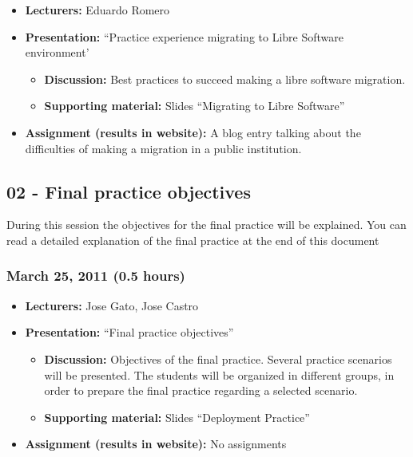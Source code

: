 \documentclass[a4paper]{article}
\begin{document}
\begin{itemize}
\item \textbf{Lecturers:} Eduardo Romero
\item \textbf{Presentation:} ``Practice experience migrating to Libre Software environment'
  \begin{itemize}
  \item \textbf{Discussion:} Best practices to succeed making a libre software migration. 
  \item \textbf{Supporting material:} Slides ``Migrating to Libre Software''
  \end{itemize}
\item \textbf{Assignment (results in website):} A blog entry talking about the difficulties of making a migration in a public institution. 
\end{itemize}

\subsection{02 - Final practice objectives}

During this session the objectives for the final practice will be explained. You can read a detailed explanation of the final practice at the end of this document

\subsubsection{March 25, 2011 (0.5 hours)}

\begin{itemize}
\item \textbf{Lecturers:} Jose Gato, Jose Castro
\item \textbf{Presentation:} ``Final practice objectives''
  \begin{itemize}
  \item \textbf{Discussion:} Objectives of the final practice. Several practice scenarios will be presented. The students will be organized in different groups, in order to prepare the final practice regarding a selected scenario. 
  \item \textbf{Supporting material:} Slides ``Deployment Practice''
  \end{itemize}
\item \textbf{Assignment (results in website):} No assignments 
\end{itemize}
\end{document}

